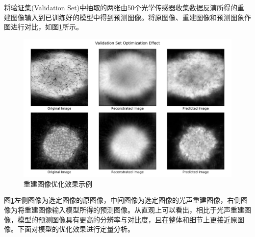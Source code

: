 将验证集(Validation Set)中抽取的两张由50个光学传感器收集数据反演所得的重建图像输入到已训练好的模型中得到预测图像。将原图像、重建图像和预测图象作图进行对比，如图\ref{img506}所示。

\begin{figure}[h]
	\centering
	\includegraphics[width=0.9\columnwidth]{image/chap05/img506.png}
	\caption{重建图像优化效果示例}
	\label{img506}
\end{figure}

图\ref{img506}左侧图像为选定图像的原图像，中间图像为选定图像的光声重建图像，右侧图像为将重建图像输入模型所得的预测图像。从直观上可以看出，相比于光声重建图像，模型的预测图像具有更高的分辨率与对比度，且在整体和细节上更接近原图像。下面对模型的优化效果进行定量分析。
